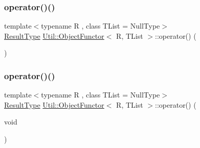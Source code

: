 \subsubsection{\texorpdfstring{operator()()}{operator()()}\hspace{0.1cm}{\footnotesize\ttfamily [1/12]}}
{\footnotesize\ttfamily template$<$typename R , class T\+List  = Null\+Type$>$ \\
\mbox{\hyperlink{classUtil_1_1ObjectFunctor_a77f816e98108848347d0dfc085090a1c}{Result\+Type}} \mbox{\hyperlink{classUtil_1_1ObjectFunctor}{Util\+::\+Object\+Functor}}$<$ R, T\+List $>$\+::operator() (\begin{DoxyParamCaption}{ }\end{DoxyParamCaption})\hspace{0.3cm}{\ttfamily [inline]}}

\mbox{\label{classUtil_1_1ObjectFunctor_a47ff83bbdf075aefe2ee26aafafd88a1}} 
\subsubsection{\texorpdfstring{operator()()}{operator()()}\hspace{0.1cm}{\footnotesize\ttfamily [2/12]}}
{\footnotesize\ttfamily template$<$typename R , class T\+List  = Null\+Type$>$ \\
\mbox{\hyperlink{classUtil_1_1ObjectFunctor_a77f816e98108848347d0dfc085090a1c}{Result\+Type}} \mbox{\hyperlink{classUtil_1_1ObjectFunctor}{Util\+::\+Object\+Functor}}$<$ R, T\+List $>$\+::operator() (\begin{DoxyParamCaption}\item[{void}]{ }\end{DoxyParamCaption})\hspace{0.3cm}{\ttfamily [inline]}}

\mbox{\label{classUtil_1_1ObjectFunctor_affe11b4a42e49e60ac921c2353e3ce18}} 

